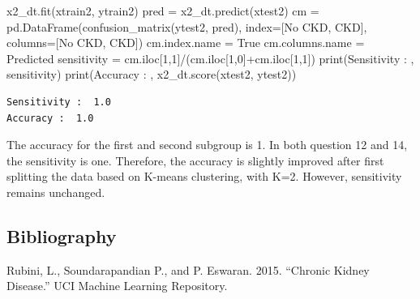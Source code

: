 \documentclass[
  11pt,
  letterpaper,
  DIV=11,
  numbers=noendperiod]{scrartcl}
\newenvironment{Shaded}{\begin{snugshade}}{\end{snugshade}}
\newcommand{\BuiltInTok}[1]{\textcolor[rgb]{0.00,0.23,0.31}{#1}}
\newcommand{\DecValTok}[1]{\textcolor[rgb]{0.68,0.00,0.00}{#1}}
\newcommand{\NormalTok}[1]{\textcolor[rgb]{0.00,0.23,0.31}{#1}}
\newcommand{\OperatorTok}[1]{\textcolor[rgb]{0.37,0.37,0.37}{#1}}
\newcommand{\StringTok}[1]{\textcolor[rgb]{0.13,0.47,0.30}{#1}}
\newlength{\cslhangindent}
\newenvironment{CSLReferences}[2] %
 {\begin{list}{}{%
  \setlength{\itemindent}{0pt}
  \setlength{\leftmargin}{0pt}
  \setlength{\parsep}{0pt}
  \ifodd #1
   \setlength{\leftmargin}{\cslhangindent}
   \setlength{\itemindent}{-1\cslhangindent}
  \fi
  \setlength{\itemsep}{#2\baselineskip}}}
 {\end{list}}
\begin{document}
\begin{Shaded}
\begin{Highlighting}[]
\NormalTok{x2\_dt.fit(xtrain2, ytrain2)}
\NormalTok{pred }\OperatorTok{=}\NormalTok{ x2\_dt.predict(xtest2)}
\NormalTok{cm }\OperatorTok{=}\NormalTok{ pd.DataFrame(confusion\_matrix(ytest2, pred), index}\OperatorTok{=}\NormalTok{[}\StringTok{\textquotesingle{}No CKD\textquotesingle{}}\NormalTok{, }\StringTok{\textquotesingle{}CKD\textquotesingle{}}\NormalTok{], columns}\OperatorTok{=}\NormalTok{[}\StringTok{\textquotesingle{}No CKD\textquotesingle{}}\NormalTok{, }\StringTok{\textquotesingle{}CKD\textquotesingle{}}\NormalTok{])}
\NormalTok{cm.index.name }\OperatorTok{=} \StringTok{\textquotesingle{}True\textquotesingle{}}
\NormalTok{cm.columns.name }\OperatorTok{=} \StringTok{\textquotesingle{}Predicted\textquotesingle{}}
\NormalTok{sensitivity }\OperatorTok{=}\NormalTok{ cm.iloc[}\DecValTok{1}\NormalTok{,}\DecValTok{1}\NormalTok{]}\OperatorTok{/}\NormalTok{(cm.iloc[}\DecValTok{1}\NormalTok{,}\DecValTok{0}\NormalTok{]}\OperatorTok{+}\NormalTok{cm.iloc[}\DecValTok{1}\NormalTok{,}\DecValTok{1}\NormalTok{])}
\BuiltInTok{print}\NormalTok{(}\StringTok{\textquotesingle{}Sensitivity : \textquotesingle{}}\NormalTok{, sensitivity)}
\BuiltInTok{print}\NormalTok{(}\StringTok{\textquotesingle{}Accuracy : \textquotesingle{}}\NormalTok{, x2\_dt.score(xtest2, ytest2))}
\end{Highlighting}
\end{Shaded}

\begin{verbatim}
Sensitivity :  1.0
Accuracy :  1.0
\end{verbatim}

The accuracy for the first and second subgroup is 1. In both question 12
and 14, the sensitivity is one. Therefore, the accuracy is slightly
improved after first splitting the data based on K-means clustering,
with K=2. However, sensitivity remains unchanged.

\subsection*{Bibliography}\label{bibliography}

\label{refs}
\begin{CSLReferences}{1}{0}
Rubini, L., Soundarapandian P., and P. Eswaran. 2015. {``{Chronic Kidney
Disease}.''} UCI Machine Learning Repository.

\end{CSLReferences}
\end{document}
